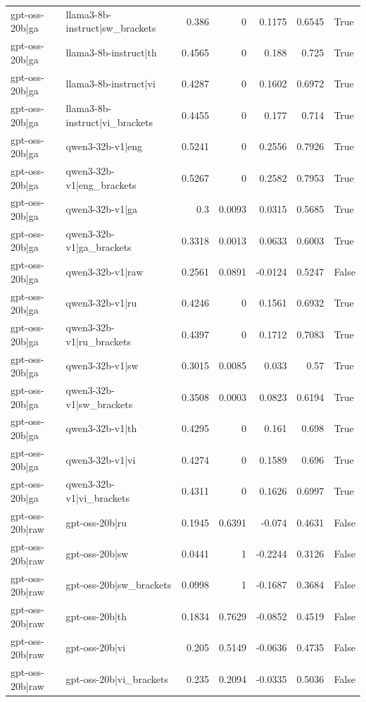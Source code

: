 \begin{table}
\begin{tabular}{l l r r r r l}
gpt-oss-20b|ga & llama3-8b-instruct|sw_brackets & 0.386 & 0 & 0.1175 & 0.6545 & True \\
gpt-oss-20b|ga & llama3-8b-instruct|th & 0.4565 & 0 & 0.188 & 0.725 & True \\
gpt-oss-20b|ga & llama3-8b-instruct|vi & 0.4287 & 0 & 0.1602 & 0.6972 & True \\
gpt-oss-20b|ga & llama3-8b-instruct|vi_brackets & 0.4455 & 0 & 0.177 & 0.714 & True \\
gpt-oss-20b|ga & qwen3-32b-v1|eng & 0.5241 & 0 & 0.2556 & 0.7926 & True \\
gpt-oss-20b|ga & qwen3-32b-v1|eng_brackets & 0.5267 & 0 & 0.2582 & 0.7953 & True \\
gpt-oss-20b|ga & qwen3-32b-v1|ga & 0.3 & 0.0093 & 0.0315 & 0.5685 & True \\
gpt-oss-20b|ga & qwen3-32b-v1|ga_brackets & 0.3318 & 0.0013 & 0.0633 & 0.6003 & True \\
gpt-oss-20b|ga & qwen3-32b-v1|raw & 0.2561 & 0.0891 & -0.0124 & 0.5247 & False \\
gpt-oss-20b|ga & qwen3-32b-v1|ru & 0.4246 & 0 & 0.1561 & 0.6932 & True \\
gpt-oss-20b|ga & qwen3-32b-v1|ru_brackets & 0.4397 & 0 & 0.1712 & 0.7083 & True \\
gpt-oss-20b|ga & qwen3-32b-v1|sw & 0.3015 & 0.0085 & 0.033 & 0.57 & True \\
gpt-oss-20b|ga & qwen3-32b-v1|sw_brackets & 0.3508 & 0.0003 & 0.0823 & 0.6194 & True \\
gpt-oss-20b|ga & qwen3-32b-v1|th & 0.4295 & 0 & 0.161 & 0.698 & True \\
gpt-oss-20b|ga & qwen3-32b-v1|vi & 0.4274 & 0 & 0.1589 & 0.696 & True \\
gpt-oss-20b|ga & qwen3-32b-v1|vi_brackets & 0.4311 & 0 & 0.1626 & 0.6997 & True \\
gpt-oss-20b|raw & gpt-oss-20b|ru & 0.1945 & 0.6391 & -0.074 & 0.4631 & False \\
gpt-oss-20b|raw & gpt-oss-20b|sw & 0.0441 & 1 & -0.2244 & 0.3126 & False \\
gpt-oss-20b|raw & gpt-oss-20b|sw_brackets & 0.0998 & 1 & -0.1687 & 0.3684 & False \\
gpt-oss-20b|raw & gpt-oss-20b|th & 0.1834 & 0.7629 & -0.0852 & 0.4519 & False \\
gpt-oss-20b|raw & gpt-oss-20b|vi & 0.205 & 0.5149 & -0.0636 & 0.4735 & False \\
gpt-oss-20b|raw & gpt-oss-20b|vi_brackets & 0.235 & 0.2094 & -0.0335 & 0.5036 & False \\

\end{tabular}
\end{table}
